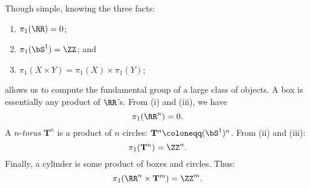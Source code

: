 \documentclass{axolotl}
\begin{document}
Though simple, knowing the three facts:
\begin{enumerate}
  \item \(\pi_1(\RR) = 0\);
  \item \(\pi_1(\bS^1) = \ZZ\); and
  \item \(\pi_1(X \times Y) = \pi_1(X) \times \pi_1(Y)\);
\end{enumerate}
allows us to compute the fundamental group of a large class of objects. A
box is essentially any product of \(\RR\)'s. From (i) and (iii), we have
\[ \pi_1(\RR^n) = 0. \]
A \(n\)-\emph{torus} \(\mathbf{T}^n\) is a product of \(n\) circles: \(\mathbf{T}^n \coloneqq (\bS^1)^n\).
From (ii) and (iii):
\[ \pi_1(\mathbf{T}^n) = \ZZ^n. \]
Finally, a cylinder is some product of boxes and circles. Thus:
\[ \pi_1(\RR^n \times \mathbf{T}^m) = \ZZ^m. \]
\end{document}
